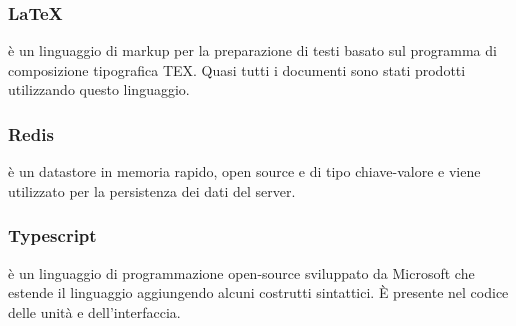 	\subsubsection{LaTeX}
	 è un linguaggio di markup per la preparazione di testi basato sul programma di composizione tipografica TEX. Quasi tutti i documenti sono stati prodotti utilizzando questo linguaggio.
	
	\subsubsection{Redis}
	 è un datastore in memoria rapido, open source e di tipo chiave-valore e viene utilizzato per la persistenza dei dati del server.

	\subsubsection{Typescript}
	 è un linguaggio di programmazione open-source sviluppato da Microsoft che estende il linguaggio  aggiungendo alcuni costrutti sintattici. È presente nel codice delle unità e dell'interfaccia.
